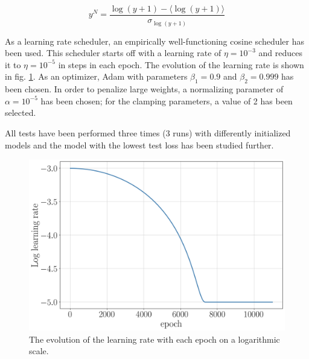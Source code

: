 \begin{equation*}
	y^N = \frac{\log(y+1)-\langle\log(y+1)\rangle}{\sigma_{\log(y+1)}}
\end{equation*}

As a learning rate scheduler, an empirically well-functioning cosine scheduler has been used. This scheduler starts off with a learning rate of $\eta = 10^{-3}$ and reduces it to $\eta = 10^{-5}$ in steps in each epoch. The evolution of the learning rate is shown in fig. \ref{fig:lr}. As an optimizer, Adam with parameters $\beta_1 = 0.9$ and $\beta_2 = 0.999$ has been chosen. In order to penalize large weights, a normalizing parameter of $\alpha = 10^{-5}$ has been chosen; for the clamping parameters, a value of 2 has been selected.

All tests have been performed three times (3 runs) with differently initialized models and the model with the lowest test loss has been studied further.

\begin{figure}[h!]
	\centering
	\includegraphics[width=0.6\linewidth]{figures/network_setup/lr}
	\caption{The evolution of the learning rate with each epoch on a logarithmic scale.}
	\label{fig:lr}
\end{figure}
